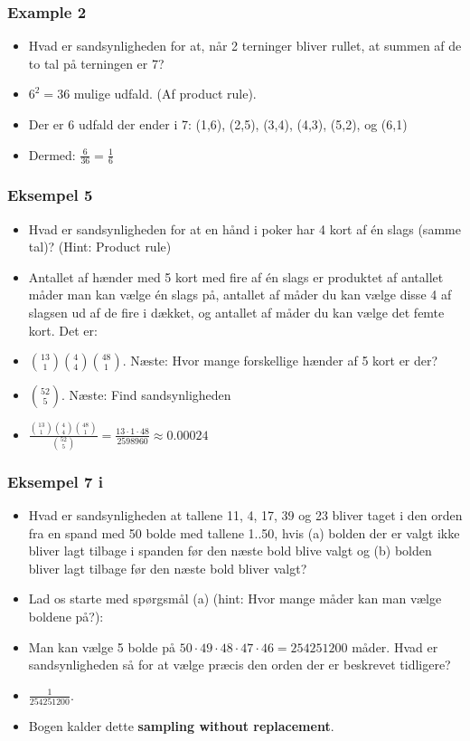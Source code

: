 \documentclass{beamer}
\begin{document}
\begin{frame}
  \frametitle{Example 2}
  \begin{itemize}
  \item<1-> Hvad er sandsynligheden for at, når 2 terninger bliver rullet, at summen af de to tal på terningen er 7?
  \item<1-> $6^2 = 36$ mulige udfald. (Af product rule).
  \item<2-> Der er 6 udfald der ender i 7: (1,6), (2,5), (3,4), (4,3), (5,2), og (6,1)
  \item<3-> Dermed: $\frac{6}{36} = \frac{1}{6}$
  \end{itemize} 
\end{frame}

\begin{frame}
  \frametitle{Eksempel 5}
  \begin{itemize}
  \item<1-> Hvad er sandsynligheden for at en hånd i poker har 4 kort af én slags (samme tal)? (Hint: Product rule)
  \item<2-> Antallet af hænder med 5 kort med fire af én slags er produktet af antallet måder man kan vælge én slags på, antallet af måder du kan vælge disse 4 af slagsen ud af de fire i dækket, og antallet af måder du kan vælge det femte kort. Det er:
  \item<3-> $\binom{13}{1}\binom{4}{4}\binom{48}{1}$. Næste: Hvor mange forskellige hænder af 5 kort er der? 
  \item<4-> $\binom{52}{5}$. Næste: Find sandsynligheden
  \item<5-> $\frac{\binom{13}{1}\binom{4}{4}\binom{48}{1}}{\binom{52}{5}}= \frac{13 \cdot 1 \cdot 48}{2598960} \approx 0.00024$
  \end{itemize}  
\end{frame}

\begin{frame}
  \frametitle{Eksempel 7 i}
  \begin{itemize}
  \item<1-> Hvad er sandsynligheden at tallene 11, 4, 17, 39 og 23 bliver taget i den orden fra en spand med 50 bolde med tallene 1..50, hvis (a) bolden der er valgt ikke bliver lagt tilbage i spanden før den næste bold blive valgt og (b) bolden bliver lagt tilbage før den næste bold bliver valgt?
  \item<1-> Lad os starte med spørgsmål (a) (hint: Hvor mange måder kan man vælge boldene på?):
  \item<2-> Man kan vælge 5 bolde på $50 \cdot 49 \cdot 48 \cdot 47 \cdot 46 = 254251200$ måder. Hvad er sandsynligheden så for at vælge præcis den orden der er beskrevet tidligere?
  \item<3-> $\frac{1}{254251200}$.
  \item<3-> Bogen kalder dette \textbf{sampling without replacement}.
  \end{itemize} 
\end{frame}
\end{document}
